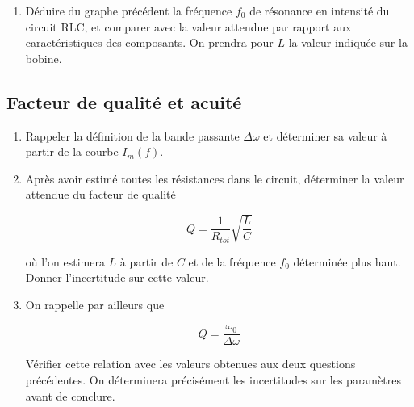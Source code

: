 \documentclass[a4paper,french,bookmarks]{article}
\begin{document}
\begin{enumerate}[resume]
    \item Déduire du graphe précédent la fréquence $f_0$ de résonance en intensité du circuit RLC, et comparer avec la valeur attendue par rapport aux caractéristiques des composants. On prendra pour $L$ la valeur indiquée sur la bobine.
    
\end{enumerate}

\subsection{Facteur de qualité et acuité}

\begin{enumerate}[resume]
    \item Rappeler la définition de la bande passante $\Delta \omega$ et déterminer sa valeur à partir de la courbe $I_m(f)$.
    
    
    \item  Après avoir estimé toutes les résistances dans le circuit, déterminer la valeur attendue du facteur de qualité
    
    \begin{equation}
        Q = \dfrac{1}{R_{tot}}\sqrt{\dfrac{L}{C}}
    \end{equation}
    
    où l’on estimera $L$ à partir de $C$ et de la fréquence $f_0$ déterminée plus haut. Donner l’incertitude sur cette valeur.
    
    
    \item On rappelle par ailleurs que
    
    \begin{equation}
        Q = \dfrac{\omega_0}{\Delta \omega}
    \end{equation}
    
    Vérifier cette relation avec les valeurs obtenues aux deux questions précédentes. On déterminera précisément les incertitudes sur les paramètres avant de conclure.
    
\end{enumerate}
\end{document}
